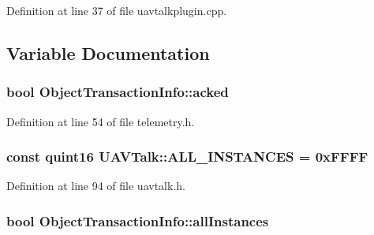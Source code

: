 \-Definition at line 37 of file uavtalkplugin.\-cpp.



\subsection{\-Variable \-Documentation}
\hypertarget{group___u_a_v_talk_plugin_ga27c9898b3e1a5940f0340891578f6ea5}{
\subsubsection[{acked}]{\setlength{\rightskip}{0pt plus 5cm}bool {\bf \-Object\-Transaction\-Info\-::acked}}}\label{group___u_a_v_talk_plugin_ga27c9898b3e1a5940f0340891578f6ea5}


\-Definition at line 54 of file telemetry.\-h.

\hypertarget{group___u_a_v_talk_plugin_ga71e922ea4fa7f9e0a9fe89ebdd2fe75c}{
\subsubsection[{\-A\-L\-L\-\_\-\-I\-N\-S\-T\-A\-N\-C\-E\-S}]{\setlength{\rightskip}{0pt plus 5cm}const quint16 {\bf \-U\-A\-V\-Talk\-::\-A\-L\-L\-\_\-\-I\-N\-S\-T\-A\-N\-C\-E\-S} = 0x\-F\-F\-F\-F}}\label{group___u_a_v_talk_plugin_ga71e922ea4fa7f9e0a9fe89ebdd2fe75c}


\-Definition at line 94 of file uavtalk.\-h.

\hypertarget{group___u_a_v_talk_plugin_gaf134962f4df09323cf89245e3bc32f6e}{
\subsubsection[{all\-Instances}]{\setlength{\rightskip}{0pt plus 5cm}bool {\bf \-Object\-Transaction\-Info\-::all\-Instances}}}\label{group___u_a_v_talk_plugin_gaf134962f4df09323cf89245e3bc32f6e}


